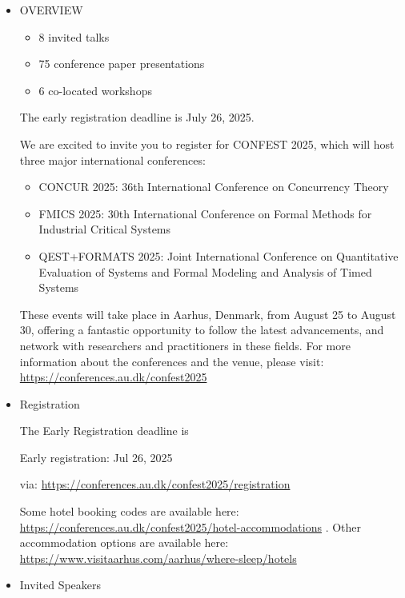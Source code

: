 \documentclass[prodmode,acmtecs]{acmsmall} %
\begin{document}
\begin{itemize}\item  OVERVIEW 
 
\begin{itemize}\item  8 invited talks
\item  75 conference paper presentations
\item  6 co-located workshops
\end{itemize} 
  The early registration deadline is July 26, 2025. 
 
  We are excited to invite you to register for CONFEST 2025, which will host three major international conferences: 
 
\begin{itemize}\item  CONCUR 2025: 36th International Conference on Concurrency Theory
\item  FMICS 2025: 30th International Conference on Formal Methods for Industrial Critical Systems
\item  QEST+FORMATS 2025: Joint International Conference on Quantitative Evaluation of Systems and Formal Modeling and Analysis of Timed Systems
\end{itemize} 
  These events will take place in Aarhus, Denmark, from August 25 to August 30, offering a fantastic opportunity to follow the latest advancements, and network with researchers and practitioners in these fields. For more information about the conferences and the venue, please visit: \href{https://conferences.au.dk/confest2025}{https://conferences.au.dk/confest2025} 
 
\item  Registration 
 
  The Early Registration deadline is  
 
Early registration: Jul 26, 2025 
 
  via: \href{https://conferences.au.dk/confest2025/registration}{https://conferences.au.dk/confest2025/registration} 
 
  Some hotel booking codes are available here: \href{https://conferences.au.dk/confest2025/hotel-accommodations}{https://conferences.au.dk/confest2025/hotel-accommodations} . Other accommodation options are available here: \href{https://www.visitaarhus.com/aarhus/where-sleep/hotels}{https://www.visitaarhus.com/aarhus/where-sleep/hotels} 
 
\item  Invited Speakers 
 

\end{itemize}
\end{document}
